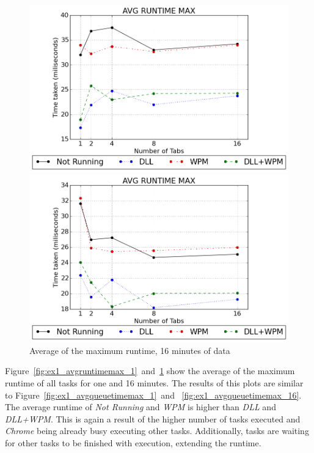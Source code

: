 \begin{figure}[h]
	\centering
    \includegraphics[width=\textwidth,height=0.45\textheight,keepaspectratio]{Evaluation/experiment1/AVG-RUNTIME-MAX-1.png}
    \caption{Average of the maximum runtime, 1 minute of data}
    \label{fig:ex1_avgruntimemax_1}
    
  	\vspace*{\floatsep}    
    
    \includegraphics[width=\textwidth,height=0.45\textheight,keepaspectratio]{Evaluation/experiment1/AVG-RUNTIME-MAX-16.png}
    \caption{Average of the maximum runtime, 16 minutes of data}
    \label{fig:ex1_avgruntimemax_16}
\end{figure}
Figure~\ref{fig:ex1_avgruntimemax_1}~and~\ref{fig:ex1_avgruntimemax_16} show the average of the maximum runtime of all tasks for one and 16 minutes. The results of this plots are similar to Figure~\ref{fig:ex1_avgqueuetimemax_1}~and~ \ref{fig:ex1_avgqueuetimemax_16}. The average runtime of \emph{Not Running} and \emph{\gls{WPM}} is higher than \emph{\gls{DLL}} and \emph{\gls{DLL}+\gls{WPM}}. This is again a result of the higher number of tasks executed and \emph{Chrome} being already busy executing other tasks. Additionally, tasks are waiting for other tasks to be finished with execution, extending the runtime.
